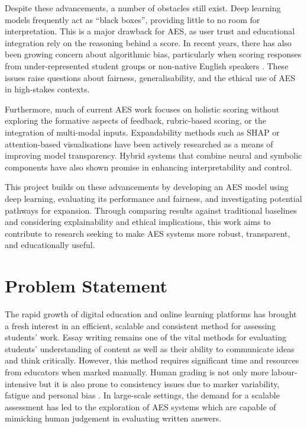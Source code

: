 \documentclass[8pt]{report}
\begin{document}
Despite these advancements, a number of obstacles still exist. Deep learning models frequently act as ``black boxes'', providing little to no room for interpretation. This is a major drawback for 
AES, as user trust and educational integration rely on the reasoning behind a score. In recent years, there has also been growing concern about algorithmic bias, particularly when scoring responses 
from under-represented student groups or non-native English speakers \parencite{blodgett2020language}. These issues raise questions about fairness, generalisability, and the ethical use of AES in 
high-stakes contexts.

Furthermore, much of current AES work focuses on holistic scoring without exploring the formative aspects of feedback, rubric-based scoring, or the integration of multi-modal inputs. Expandability 
methods such as SHAP \parencite{lundberg2017unified} or attention-based visualisations have been actively researched as a means of improving model transparency. Hybrid systems that combine neural 
and symbolic components have also shown promise in enhancing interpretability and control.

This project builds on these advancements by developing an AES model using deep learning, evaluating its performance and fairness, and investigating potential pathways for expansion. Through comparing 
results against traditional baselines and considering explainability and ethical implications, this work aims to contribute to research seeking to make AES systems more robust, transparent, and 
educationally useful.


\section{Problem Statement}
The rapid growth of digital education and online learning platforms has brought a fresh interest in an efficient, scalable and consistent method for assessing students' work. Essay writing remains one of 
the vital methods for evaluating students' understanding of content as well as their ability to communicate ideas and think critically. However, this method requires significant time and resources from 
educators when marked manually. Human grading is not only more labour-intensive but it is also prone to consistency issues due to marker variability, fatigue and personal bias \parencite{page2003}. In 
large-scale settings, the demand for a scalable assessment has led to the exploration of AES systems which are capable of mimicking human judgement in evaluating written answers.
\end{document}
